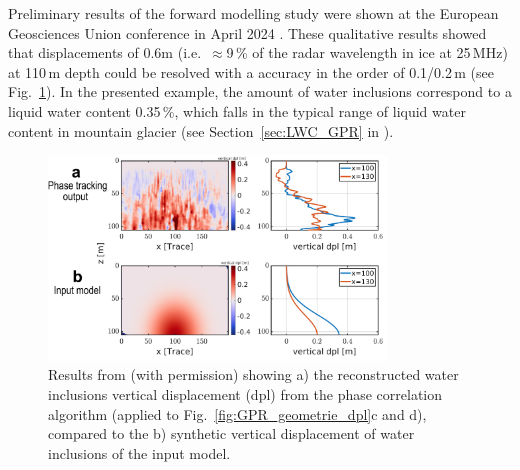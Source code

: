 Preliminary results of the forward modelling study were shown at the European Geosciences Union conference in April 2024 \citep{Aichele&al2024}. These qualitative results showed that displacements of 0.6m (i.e.\ $\approx$9\,\% of the radar wavelength in ice at 25\,MHz) at 110\,m depth could be resolved with a accuracy in the order of 0.1/0.2\,m (see Fig.~\ref{fig:GPR_phase}). In the presented example, the amount of water inclusions correspond to a liquid water content 0.35\,\%, which falls in the typical range of liquid water content in mountain glacier (see Section~\ref{sec:LWC_GPR} in \citep{Ogier&al2023}).


\begin{figure}[h]
    \centering
    \includegraphics[width=0.8\textwidth]{chapters/Discussion/GPR_dpl_phase.pdf}
    \caption{Results from \cite{Aichele&al2024} (with permission) showing a) the reconstructed water inclusions vertical displacement (dpl) from the phase correlation algorithm (applied to Fig.~\ref{fig:GPR_geometrie_dpl}c and d), compared to the b) synthetic vertical displacement of water inclusions of the input model.}
    \label{fig:GPR_phase}
\end{figure}

